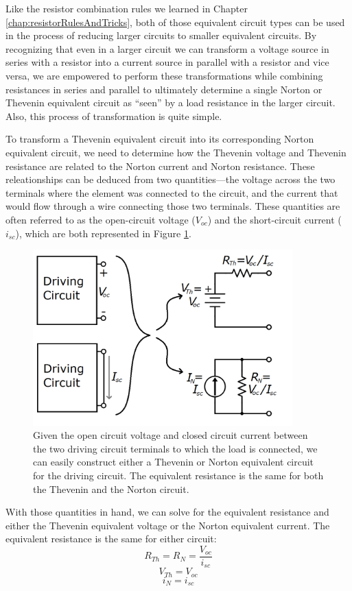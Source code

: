 \par
Like the resistor combination rules we learned in Chapter \ref{chap:resistorRulesAndTricks}, both of those equivalent circuit types can be used in the process of reducing larger circuits to smaller equivalent circuits. By recognizing that even in a larger circuit we can transform a voltage source in series with a resistor into a current source in parallel with a resistor and vice versa, we are empowered to perform these transformations while combining resistances in series and parallel to ultimately determine a single Norton or Thevenin equivalent circuit as ``seen'' by a load resistance in the larger circuit. Also, this process of transformation is quite simple. 
\par
To transform a Thevenin equivalent circuit into its corresponding Norton equivalent circuit, we need to determine how the Thevenin voltage and Thevenin resistance are related to the Norton current and Norton resistance. These releationships can be deduced from two quantities---the voltage across the two terminals where the element was connected to the circuit, and the current that would flow through a wire connecting those two terminals. These quantities are often referred to as the open-circuit voltage ($V_{oc}$) and the short-circuit current ($i_{sc}$), which are both represented in Figure \ref{ThevToNortFromOC_SC}. 
\begin{figure}[h!]
\centering
\includegraphics[width=10cm]{figures/thevNortFromOC_SC.png}
\caption{Given the open circuit voltage and closed circuit current between the two driving circuit terminals to which the load is connected, we can easily construct either a Thevenin or Norton equivalent circuit for the driving circuit. The equivalent resistance is the same for both the Thevenin and the Norton circuit.}
\label{ThevToNortFromOC_SC}
\end{figure}
With those quantities in hand, we can solve for the equivalent resistance and either the Thevenin equivalent voltage or the Norton equivalent current. The equivalent resistance is the same for either circuit:
$$
R_{Th} = R_{N} = \frac{V_{oc}}{i_{sc}}
$$
$$
V_{Th} = V_{oc}
$$
$$
i_{N} = i_{sc}
$$

